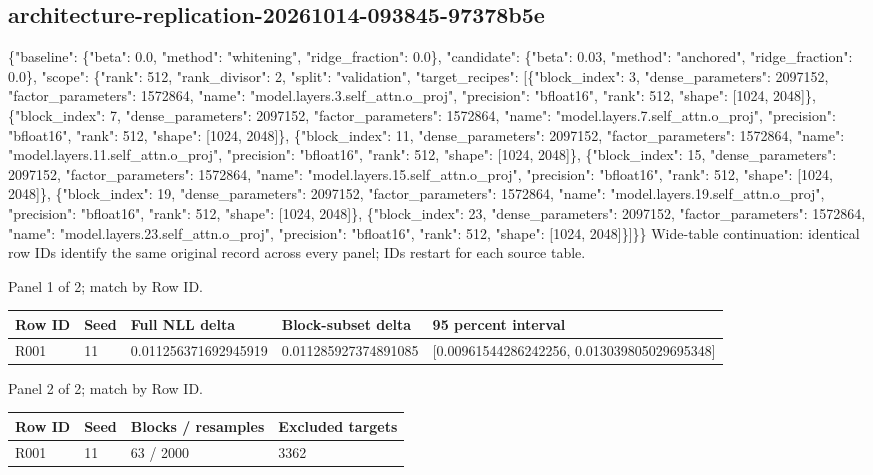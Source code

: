\documentclass[10pt]{article}
\begin{document}
\subsection{architecture-replication-20261014-093845-97378b5e}
\{"baseline": \{"beta": 0.0, "method": "whitening", "ridge\_fraction": 0.0\}, "candidate": \{"beta": 0.03, "method": "anchored", "ridge\_fraction": 0.0\}, "scope": \{"rank": 512, "rank\_divisor": 2, "split": "validation", "target\_recipes": [\{"block\_index": 3, "dense\_parameters": 2097152, "factor\_parameters": 1572864, "name": "model.layers.3.self\_attn.o\_proj", "precision": "bfloat16", "rank": 512, "shape": [1024, 2048]\}, \{"block\_index": 7, "dense\_parameters": 2097152, "factor\_parameters": 1572864, "name": "model.layers.7.self\_attn.o\_proj", "precision": "bfloat16", "rank": 512, "shape": [1024, 2048]\}, \{"block\_index": 11, "dense\_parameters": 2097152, "factor\_parameters": 1572864, "name": "model.layers.11.self\_attn.o\_proj", "precision": "bfloat16", "rank": 512, "shape": [1024, 2048]\}, \{"block\_index": 15, "dense\_parameters": 2097152, "factor\_parameters": 1572864, "name": "model.layers.15.self\_attn.o\_proj", "precision": "bfloat16", "rank": 512, "shape": [1024, 2048]\}, \{"block\_index": 19, "dense\_parameters": 2097152, "factor\_parameters": 1572864, "name": "model.layers.19.self\_attn.o\_proj", "precision": "bfloat16", "rank": 512, "shape": [1024, 2048]\}, \{"block\_index": 23, "dense\_parameters": 2097152, "factor\_parameters": 1572864, "name": "model.layers.23.self\_attn.o\_proj", "precision": "bfloat16", "rank": 512, "shape": [1024, 2048]\}]\}\}
Wide-table continuation: identical row IDs identify the same original record across every panel; IDs restart for each source table.
\par\noindent Panel 1 of 2; match by Row ID.
{\scriptsize\setlength{\tabcolsep}{2pt}
\begin{longtable}{p{}p{}p{}p{}p{}}
Row ID & Seed & Full NLL delta & Block-subset delta & 95 percent interval \\
\hline\endhead
R001 & 11 & 0.011256371692945919 & 0.011285927374891085 & [0.00961544286242256, 0.013039805029695348] \\
\end{longtable}}
\par\noindent Panel 2 of 2; match by Row ID.
{\scriptsize\setlength{\tabcolsep}{2pt}
\begin{longtable}{p{}p{}p{}p{}}
Row ID & Seed & Blocks / resamples & Excluded targets \\
\hline\endhead
R001 & 11 & 63 / 2000 & 3362 \\
\end{longtable}}
\end{document}
